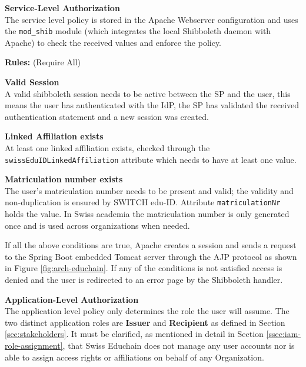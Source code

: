 \begin{description}
	\item\textbf{Service-Level Authorization} \hfill \\
	The service level policy is stored in the Apache Webserver configuration and uses the \texttt{mod\_shib} module (which integrates the local Shibboleth daemon with Apache) to check the received values and enforce the policy. 
	
	\textbf{Rules:} (Require All)
	\begin{description}
		\item\textbf{Valid Session} \hfill \\
		A valid shibboleth session needs to be active between the SP and the user, this means the user has authenticated with the IdP, the SP has validated the received authentication statement and a new session was created. 
		\item\textbf{Linked Affiliation exists} \hfill \\
		At least one linked affiliation exists, checked through the \texttt{swissEduIDLinkedAffiliation} attribute which needs to have at least one value.
		\item\textbf{Matriculation number exists} \hfill \\ 
		The user's matriculation number needs to be present and valid; the validity and non-duplication is ensured by SWITCH edu-ID. Attribute \texttt{matriculationNr} holds the value. In Swiss academia the matriculation number is only generated once and is used across organizations when needed.
	\end{description}

	If all the above conditions are true, Apache creates a session and sends a request to the Spring Boot embedded Tomcat server through the AJP protocol as shown in Figure \ref{fig:arch-educhain}. If any of the conditions is not satisfied access is denied and the user is redirected to an error page by the Shibboleth handler.
	
	\item\textbf{Application-Level Authorization} \hfill \\
	The application level policy only determines the role the user will assume. The two distinct application roles are \textbf{Issuer} and \textbf{Recipient} as defined in Section \ref{sec:stakeholders}.
	It must be clarified, as mentioned in detail in Section \ref{ssec:iam-role-assignment}, that Swiss Educhain does not manage any user accounts nor is able to assign access rights or affiliations on behalf of any Organization.


\end{description}
